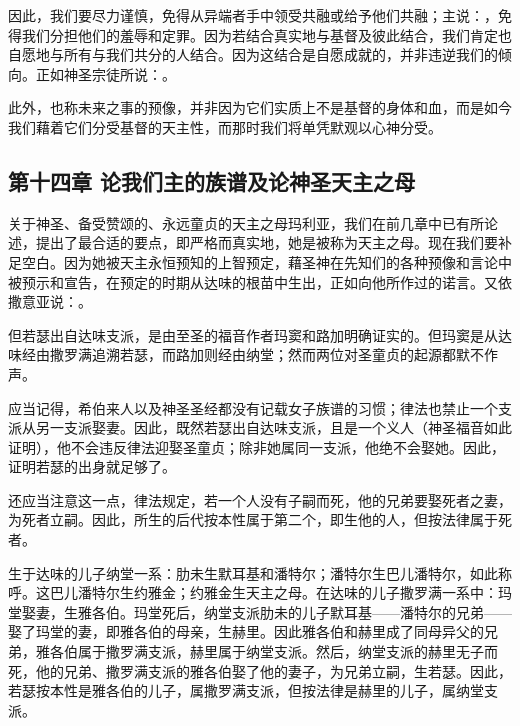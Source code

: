 因此，我们要尽力谨慎，免得从异端者手中领受共融或给予他们共融；主说：，免得我们分担他们的羞辱和定罪。因为若结合真实地与基督及彼此结合，我们肯定也自愿地与所有与我们共分的人结合。因为这结合是自愿成就的，并非违逆我们的倾向。正如神圣宗徒所说：。\par

此外，也称未来之事的预像，并非因为它们实质上不是基督的身体和血，而是如今我们藉着它们分受基督的天主性，而那时我们将单凭默观以心神分受。\par


\subsection{第十四章 论我们主的族谱及论神圣天主之母}

关于神圣、备受赞颂的、永远童贞的天主之母玛利亚，我们在前几章中已有所论述，提出了最合适的要点，即严格而真实地，她是被称为天主之母。现在我们要补足空白。因为她被天主永恒预知的上智预定，藉圣神在先知们的各种预像和言论中被预示和宣告，在预定的时期从达味的根苗中生出，正如向他所作过的诺言。又依撒意亚说：。\par

但若瑟出自达味支派，是由至圣的福音作者玛窦和路加明确证实的。但玛窦是从达味经由撒罗满追溯若瑟，而路加则经由纳堂；然而两位对圣童贞的起源都默不作声。\par

应当记得，希伯来人以及神圣圣经都没有记载女子族谱的习惯；律法也禁止一个支派从另一支派娶妻。因此，既然若瑟出自达味支派，且是一个义人（神圣福音如此证明），他不会违反律法迎娶圣童贞；除非她属同一支派，他绝不会娶她。因此，证明若瑟的出身就足够了。\par

还应当注意这一点，律法规定，若一个人没有子嗣而死，他的兄弟要娶死者之妻，为死者立嗣。因此，所生的后代按本性属于第二个，即生他的人，但按法律属于死者。\par

生于达味的儿子纳堂一系：肋未生默耳基和潘特尔；潘特尔生巴儿潘特尔，如此称呼。这巴儿潘特尔生约雅金；约雅金生天主之母。在达味的儿子撒罗满一系中：玛堂娶妻，生雅各伯。玛堂死后，纳堂支派肋未的儿子默耳基——潘特尔的兄弟——娶了玛堂的妻，即雅各伯的母亲，生赫里。因此雅各伯和赫里成了同母异父的兄弟，雅各伯属于撒罗满支派，赫里属于纳堂支派。然后，纳堂支派的赫里无子而死，他的兄弟、撒罗满支派的雅各伯娶了他的妻子，为兄弟立嗣，生若瑟。因此，若瑟按本性是雅各伯的儿子，属撒罗满支派，但按法律是赫里的儿子，属纳堂支派。\par

